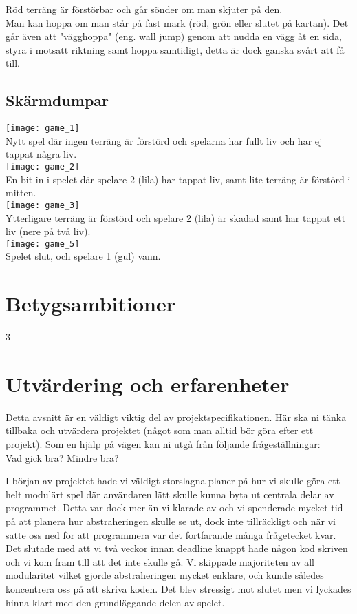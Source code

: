 \vspace{11pt}
Röd terräng är förstörbar och går sönder om man skjuter på den.\\
\vspace{11pt}
Man kan hoppa om man står på fast mark (röd, grön eller slutet på kartan). Det går även att "vägghoppa" (eng. wall jump) genom att nudda en vägg åt en sida, styra i motsatt riktning samt hoppa samtidigt, detta är dock ganska svårt att få till.\\
\vspace{11pt}
\subsection{Skärmdumpar}
\texttt{[image: game\_1]}\\
Nytt spel där ingen terräng är förstörd och spelarna har fullt liv och har ej tappat några liv.\\
\texttt{[image: game\_2]}\\
En bit in i spelet där spelare 2 (lila) har tappat liv, samt lite terräng är förstörd i mitten.\\
\texttt{[image: game\_3]}\\
Ytterligare terräng är förstörd och spelare 2 (lila) är skadad samt har tappat ett liv (nere på två liv).\\
\texttt{[image: game\_5]}\\
Spelet slut, och spelare 1 (gul) vann.\\
\section{Betygsambitioner}
3
\section{Utvärdering och erfarenheter}
{\color{red}Detta avsnitt är en väldigt viktig del av projektspecifikationen. Här ska ni tänka tillbaka och utvärdera projektet (något som man alltid bör göra efter ett projekt). Som en hjälp på vägen kan ni utgå från följande frågeställningar:\\
Vad gick bra? Mindre bra?\\}

I början av projektet hade vi väldigt storslagna planer på hur vi skulle göra ett helt modulärt spel där användaren lätt skulle kunna byta ut centrala delar av programmet. Detta var dock mer än vi klarade av och vi spenderade mycket tid på att planera hur abstraheringen skulle se ut, dock inte tillräckligt och när vi satte oss ned för att programmera var det fortfarande många frågetecket kvar. Det slutade med att vi två veckor innan deadline knappt hade någon kod skriven och vi kom fram till att det inte skulle gå. Vi skippade majoriteten av all modularitet vilket gjorde abstraheringen mycket enklare, och kunde således koncentrera oss på att skriva koden. Det blev stressigt mot slutet men vi lyckades hinna klart med den grundläggande delen av spelet. 

